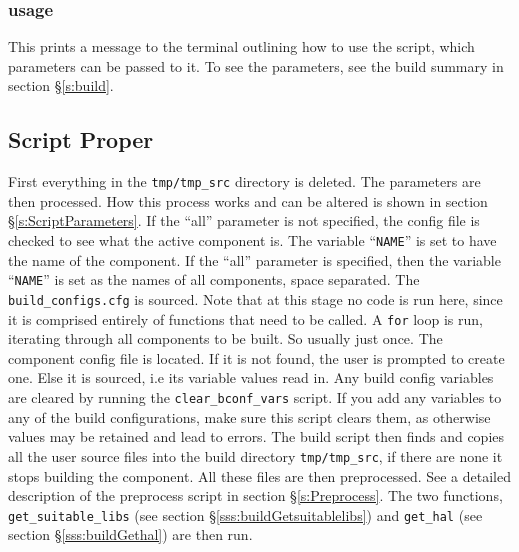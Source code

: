 \documentclass[a4paper, oneside, 11pt, titlepage, onecolumn, openright]{report}
\begin{document}
\subsubsection{usage}
			\label{sss:buildUsage}
			This prints a message to the terminal outlining how to use the script, which parameters can be passed to it. To see the parameters, see the build summary in section \S\ref{s:build}. 

			
			
\subsection{Script Proper}
			\label{sss:buildScriptProper}
			First everything in the \texttt{tmp/tmp\_src} directory is deleted. The parameters are then processed. How this process works and can be altered is shown in section \S\ref{s:ScriptParameters}.\newline
			If the ``all'' parameter is not specified, the config file is checked to see what the active component is. The variable ``\texttt{NAME}'' is set to have the name of the component.\newline
			If the ``all'' parameter is specified, then the variable ``\texttt{NAME}'' is set as the names of all components, space separated.\newline
			The \texttt{build\_configs.cfg} is sourced. Note that at this stage no code is run here, since it is comprised entirely of functions that need to be called.\newline
			A \texttt{for} loop is run, iterating through all components to be built. So usually just once.\newline
			The component config file is located. If it is not found, the user is prompted to create one. Else it is sourced, i.e its variable values read in. Any build config variables are cleared by running the \texttt{clear\_bconf\_vars} script. If you add any variables to any of the build configurations, make sure this script clears them, as otherwise values may be retained and lead to errors.\newline
			The build script then finds and copies all the user source files into the build directory \texttt{tmp/tmp\_src}, if there are none it stops building the component. All these files are then preprocessed. See a detailed description of the preprocess script in section \S\ref{s:Preprocess}.
			The two functions, \texttt{get\_suitable\_libs} (see section \S\ref{sss:buildGetsuitablelibs}) and \texttt{get\_hal} (see section \S\ref{sss:buildGethal}) are then run.
			
\end{document}
